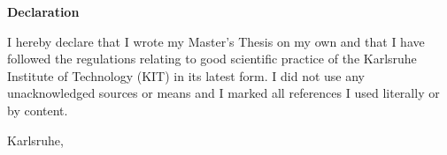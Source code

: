 {\begin{titlepage}
	\vspace*{\fill}
	{\Large\textbf{Declaration}\par}\bigskip%
	I hereby declare that I wrote my Master's Thesis on my own and that I have followed the regulations relating to good scientific practice of the Karlsruhe Institute of Technology (KIT) in its latest form. I did not use any unacknowledged sources or means and I marked all references I used literally or by content. \par\bigskip%
	Karlsruhe, \EndDatum\par\vspace{5ex}%
\end{titlepage}


}

\maketitle 

